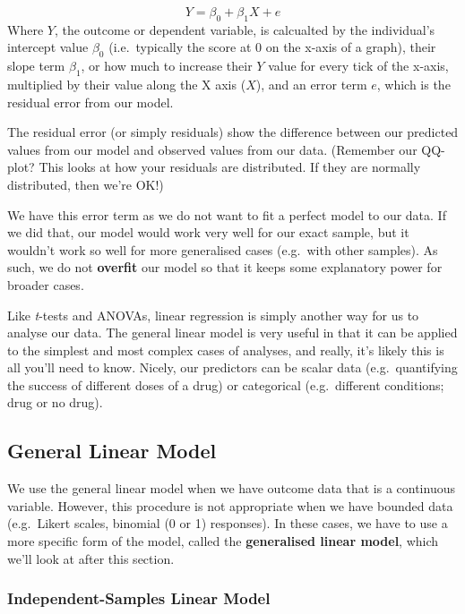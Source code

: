 \documentclass[
]{book}
\begin{document}
\[Y = \beta_0 + \beta_1 X + e\]
Where \(Y\), the outcome or dependent variable, is calcualted by the individual's intercept value \(\beta_0\) (i.e.~typically the score at 0 on the x-axis of a graph), their slope term \(\beta_1\), or how much to increase their \(Y\) value for every tick of the x-axis, multiplied by their value along the X axis (\(X\)), and an error term \(e\), which is the residual error from our model.

The residual error (or simply residuals) show the difference between our predicted values from our model and observed values from our data. (Remember our QQ-plot? This looks at how your residuals are distributed. If they are normally distributed, then we're OK!)

We have this error term as we do not want to fit a perfect model to our data. If we did that, our model would work very well for our exact sample, but it wouldn't work so well for more generalised cases (e.g.~with other samples). As such, we do not \textbf{overfit} our model so that it keeps some explanatory power for broader cases.

Like \emph{t}-tests and ANOVAs, linear regression is simply another way for us to analyse our data. The general linear model is very useful in that it can be applied to the simplest and most complex cases of analyses, and really, it's likely this is all you'll need to know. Nicely, our predictors can be scalar data (e.g.~quantifying the success of different doses of a drug) or categorical (e.g.~different conditions; drug or no drug).

\hypertarget{general-linear-model}{%
\subsection{General Linear Model}\label{general-linear-model}}

We use the general linear model when we have outcome data that is a continuous variable. However, this procedure is not appropriate when we have bounded data (e.g.~Likert scales, binomial (0 or 1) responses). In these cases, we have to use a more specific form of the model, called the \textbf{generalised linear model}, which we'll look at after this section.

\hypertarget{independent-samples-linear-model}{%
\subsubsection{Independent-Samples Linear Model}\label{independent-samples-linear-model}}
\end{document}
